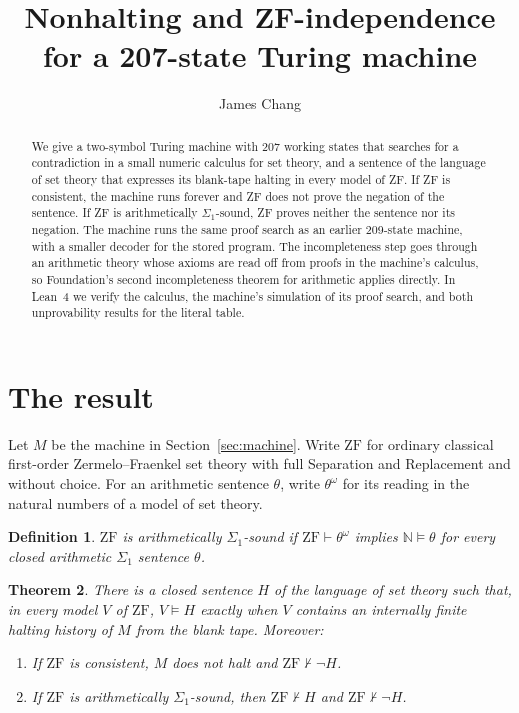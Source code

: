 \documentclass[11pt,letterpaper]{article}
\title{Nonhalting and ZF-independence\\for a 207-state Turing machine}
\author{James Chang}
\date{}
\newtheorem{theorem}{Theorem}[section]
\newtheorem{definition}[theorem]{Definition}
\newcommand{\ZF}{\mathrm{ZF}}
\newcommand{\N}{\mathbb{N}}
\begin{document}
\maketitle

\begin{abstract}
We give a two-symbol Turing machine with 207 working states that
searches for a contradiction in a small numeric calculus for set theory,
and a sentence of the language of set theory that expresses its
blank-tape halting in every model of ZF. If ZF is consistent, the machine
runs forever and ZF does not prove the negation of the sentence. If ZF is
arithmetically $\Sigma_1$-sound, ZF proves neither the sentence nor its
negation. The machine runs the same proof search as an earlier 209-state
machine, with a smaller decoder for the stored program. The
incompleteness step goes through an arithmetic theory whose axioms are
read off from proofs in the machine's calculus, so Foundation's second
incompleteness theorem for arithmetic applies directly. In Lean~4 we
verify the calculus, the machine's simulation of its proof search, and
both unprovability results for the literal table.
\end{abstract}

\section{The result}\label{sec:result}

Let $M$ be the machine in Section~\ref{sec:machine}. Write $\ZF$ for
ordinary classical first-order Zermelo--Fraenkel set theory with full
Separation and Replacement and without choice. For an arithmetic sentence
$\theta$, write $\theta^\omega$ for its reading in the natural numbers of
a model of set theory.

\begin{definition}
$\ZF$ is \emph{arithmetically $\Sigma_1$-sound} if $\ZF\vdash\theta^\omega$
implies $\N\models\theta$ for every closed arithmetic $\Sigma_1$ sentence
$\theta$.
\end{definition}

\begin{theorem}\label{thm:main}
There is a closed sentence $H$ of the language of set theory such that,
in every model $V$ of $\ZF$, $V\models H$ exactly when $V$ contains an
internally finite halting history of $M$ from the blank tape. Moreover:
\begin{enumerate}
\item If $\ZF$ is consistent, $M$ does not halt and $\ZF\nvdash\neg H$.
\item If $\ZF$ is arithmetically $\Sigma_1$-sound, then $\ZF\nvdash H$
  and $\ZF\nvdash\neg H$.
\end{enumerate}
\end{theorem}
\end{document}
